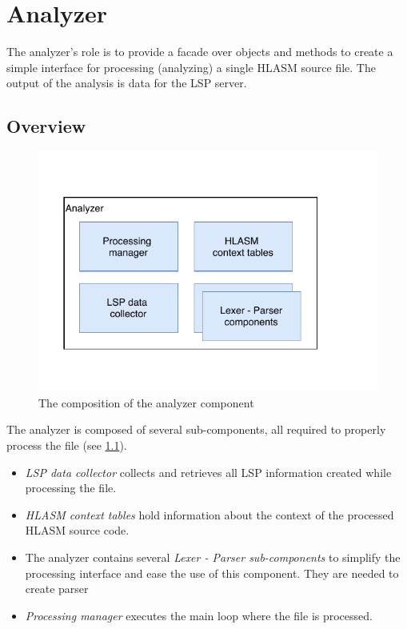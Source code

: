 \chapter {Analyzer}
\label{chap:analyzer}

The analyzer's role is to provide a facade over objects and methods to create a simple interface for processing (analyzing) a single HLASM source file. The output of the analysis is data for the LSP server.

\section{Overview}

\begin{figure}
	\centering
	\includegraphics[width=\textwidth / 2]{img/analyzer_arch}
	\caption{The composition of the analyzer component}
	\label{fig06:analyzer}
\end{figure}

The analyzer is composed of several sub-components, all required to properly process the file (see \cref{fig06:analyzer}). 
\begin{itemize}
	\item \emph{LSP data collector} collects and retrieves all LSP information created while processing the file.
	\item \emph{HLASM context tables} hold information about the context of the processed HLASM source code.
	\item The analyzer contains several \emph{Lexer - Parser sub-components} to simplify the processing interface and ease the use of this component. They are needed to create parser
	\item \emph{Processing manager} executes the main loop where the file is processed.
\end{itemize}

